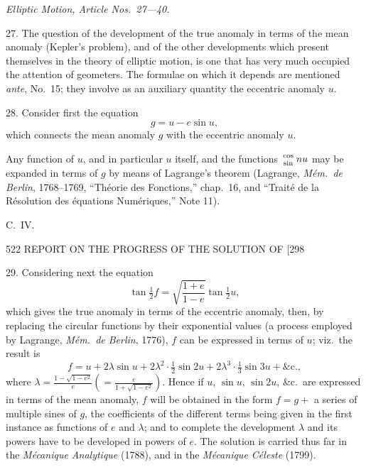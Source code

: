 \documentclass[11pt]{article}
\begin{document}
\medskip
\begin{center}\textit{Elliptic Motion, Article Nos.\ 27---40.}\end{center}

27. The question of the development of the true anomaly in terms of the mean anomaly (Kepler's problem), and of the other developments which present themselves in the theory of elliptic motion, is one that has very much occupied the attention of geometers. The formulae on which it depends are mentioned \emph{ante}, No.\ 15; they involve as an auxiliary quantity the eccentric anomaly $u$.

28. Consider first the equation
\[ g = u-e\sin u, \]
which connects the mean anomaly $g$ with the eccentric anomaly $u$.

Any function of $u$, and in particular $u$ itself, and the functions $\genfrac{}{}{0pt}{}{\cos}{\sin}\,nu$ may be expanded in terms of $g$ by means of Lagrange's theorem (Lagrange, \emph{M\'em.\ de Berlin}, 1768--1769, ``Th\'eorie des Fonctions,'' chap.\ 16, and ``Trait\'e de la R\'esolution des \'equations Num\'eriques,'' Note 11).

\vfill
\begin{flushright}\small C.\ IV.\end{flushright}

\newpage
\begin{center}
522 \hfill REPORT ON THE PROGRESS OF THE SOLUTION OF \hfill [298
\end{center}

29. Considering next the equation
\[ \tan\tfrac{1}{2}f = \sqrt{\frac{1+e}{1-e}}\tan\tfrac{1}{2}u, \]
which gives the true anomaly in terms of the eccentric anomaly, then, by replacing the circular functions by their exponential values (a process employed by Lagrange, \emph{M\'em.\ de Berlin}, 1776), $f$ can be expressed in terms of $u$; viz.\ the result is
\[ f = u+2\lambda\sin u+2\lambda^{2}\cdot\tfrac{1}{2}\sin 2u+2\lambda^{3}\cdot\tfrac{1}{3}\sin 3u+\&\text{c.}, \]
where $\lambda = \frac{1-\sqrt{1-e^{2}}}{e}\left(=\frac{e}{1+\sqrt{1-e^{2}}}\right)$. Hence if $u$, $\sin u$, $\sin 2u$, \&c.\ are expressed in terms of the mean anomaly, $f$ will be obtained in the form $f=g+$ a series of multiple sines of $g$, the coefficients of the different terms being given in the first instance as functions of $e$ and $\lambda$; and to complete the development $\lambda$ and its powers have to be developed in powers of $e$. The solution is carried thus far in the \emph{M\'ecanique Analytique} (1788), and in the \emph{M\'ecanique C\'eleste} (1799).
\end{document}
